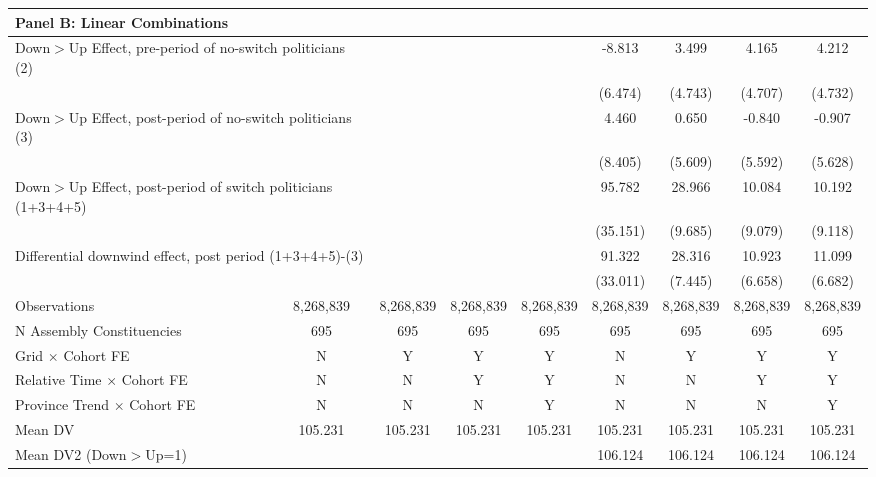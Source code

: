 {\begin{tabular}{l*{8}{c}}
\hline
\multicolumn{9}{l}{\textbf{Panel B: Linear Combinations}} \\ \hline
\multicolumn{2}{l}{Down$>$Up Effect, pre-period of no-switch politicians (2)}&            &            &            &      -8.813&       3.499&       4.165&       4.212\\
\multicolumn{2}{l}{}&            &            &            &     (6.474)&     (4.743)&     (4.707)&     (4.732)\\
\multicolumn{2}{l}{Down$>$Up Effect, post-period of no-switch politicians (3)}&            &            &            &       4.460&       0.650&      -0.840&      -0.907\\
\multicolumn{2}{l}{}&            &            &            &     (8.405)&     (5.609)&     (5.592)&     (5.628)\\
\multicolumn{2}{l}{Down$>$Up Effect, post-period of switch politicians (1+3+4+5)}&            &            &            &95.782\sym{***}&28.966\sym{***}&      10.084&      10.192\\
\multicolumn{2}{l}{}&            &            &            &    (35.151)&     (9.685)&     (9.079)&     (9.118)\\
\multicolumn{2}{l}{Differential downwind effect, post period (1+3+4+5)-(3)}&            &            &            &91.322\sym{***}&28.316\sym{***}&      10.923&11.099\sym{*}\\
\multicolumn{2}{l}{}&            &            &            &    (33.011)&     (7.445)&     (6.658)&     (6.682)\\



\hline
Observations&   8,268,839&   8,268,839&   8,268,839&   8,268,839&   8,268,839&   8,268,839&   8,268,839&   8,268,839\\
N Assembly Constituencies&         695&         695&         695&         695&         695&         695&         695&         695\\
Grid $\times$ Cohort FE&           N&           Y&           Y&           Y&           N&           Y&           Y&           Y\\
Relative Time $\times$ Cohort FE&           N&           N&           Y&           Y&           N&           N&           Y&           Y\\
Province Trend $\times$ Cohort FE&           N&           N&           N&           Y&           N&           N&           N&           Y\\
Mean DV     &     105.231&     105.231&     105.231&     105.231&     105.231&     105.231&     105.231&     105.231\\
Mean DV2 (Down$>$Up=1)&            &            &            &            &     106.124&     106.124&     106.124&     106.124\\
\hline
\end{tabular}
}
